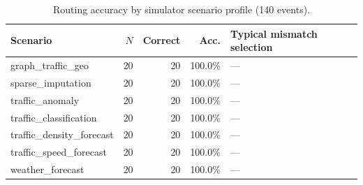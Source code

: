 \begin{table}[H]
  \centering
  \caption{Routing accuracy by simulator scenario profile (140 events).}
  \label{tab:routing-mismatch}
  \small
  \begin{tabular}{@{}lrrrl@{}}
    \toprule
    Scenario & $N$ & Correct & Acc. & Typical mismatch selection \\
    \midrule
    graph\_traffic\_geo & 20 & 20 & 100.0\% & --- \\
sparse\_imputation & 20 & 20 & 100.0\% & --- \\
traffic\_anomaly & 20 & 20 & 100.0\% & --- \\
traffic\_classification & 20 & 20 & 100.0\% & --- \\
traffic\_density\_forecast & 20 & 20 & 100.0\% & --- \\
traffic\_speed\_forecast & 20 & 20 & 100.0\% & --- \\
weather\_forecast & 20 & 20 & 100.0\% & --- \\
    \bottomrule
  \end{tabular}
\end{table}
